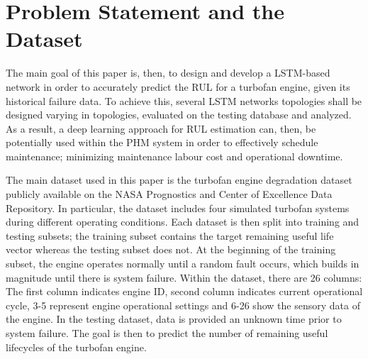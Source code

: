 \documentclass[journal]{IEEEtran}
\begin{document}
\section{Problem Statement and the Dataset}
\label{Problem Statement and the Dataset}

The main goal of this paper is, then, to design and develop a LSTM-based network in order to accurately predict the RUL for a turbofan engine, given its historical failure data. To achieve this, several LSTM networks topologies shall be designed varying in topologies, evaluated on the testing database and analyzed. As a result, a deep learning approach for RUL estimation can, then, be potentially used within the PHM system in order to effectively schedule maintenance; minimizing maintenance labour cost and operational downtime. 

The main dataset used in this paper is the turbofan engine degradation dataset publicly available on the NASA Prognostics and Center of Excellence Data Repository. In particular, the dataset includes four simulated turbofan systems during different operating conditions. Each dataset is then split into training and testing subsets; the training subset contains the target remaining useful life vector whereas the testing subset does not. At the beginning of the training subset, the engine operates normally until a random fault occurs, which builds in magnitude until there is system failure. Within the dataset, there are 26 columns: The first column indicates engine ID, second column indicates current operational cycle, 3-5 represent engine operational settings and 6-26 show the sensory data of the engine. In the testing dataset, data is provided an unknown time prior to system failure. The goal is then to predict the number of remaining useful lifecycles of the turbofan engine. 
\end{document}
